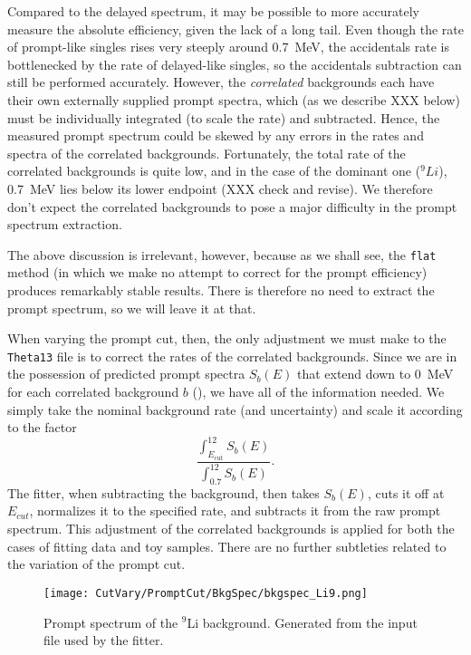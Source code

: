 \documentclass[../thesis.tex]{subfiles}
\begin{document}
Compared to the delayed spectrum, it may be possible to more accurately measure the absolute efficiency, given the lack of a long tail. Even though the rate of prompt-like singles rises very steeply around 0.7~MeV, the accidentals rate is bottlenecked by the rate of delayed-like singles, so the accidentals subtraction can still be performed accurately. However, the \emph{correlated} backgrounds each have their own externally supplied prompt spectra, which (as we describe XXX below) must be individually integrated (to scale the rate) and subtracted. Hence, the measured prompt spectrum could be skewed by any errors in the rates and spectra of the correlated backgrounds. Fortunately, the total rate of the correlated backgrounds is quite low, and in the case of the dominant one ($^9Li$), 0.7~MeV lies below its lower endpoint (XXX check and revise). We therefore don't expect the correlated backgrounds to pose a major difficulty in the prompt spectrum extraction.

The above discussion is irrelevant, however, because as we shall see, the \texttt{flat} method (in which we make no attempt to correct for the prompt efficiency) produces remarkably stable results. There is therefore no need to extract the prompt spectrum, so we will leave it at that.

When varying the prompt cut, then, the only adjustment we must make to the \texttt{Theta13} file is to correct the rates of the correlated backgrounds. Since we are in the possession of predicted prompt spectra $S_b(E)$ that extend down to 0~MeV for each correlated background $b$ (), we have all of the information needed. We simply take the nominal background rate (and uncertainty) and scale it according to the factor
\[
  \frac{\int_{E_{\mathrm{cut}}}^{12} S_b(E)}{\int_{0.7}^{12} S_b(E)}.
\]
The fitter, when subtracting the background, then takes $S_b(E)$, cuts it off at $E_{cut}$, normalizes it to the specified rate, and subtracts it from the raw prompt spectrum. This adjustment of the correlated backgrounds is applied for both the cases of fitting data and toy samples. There are no further subtleties related to the variation of the prompt cut.

\begin{figure}[h]
  \texttt{[image: CutVary/PromptCut/BkgSpec/bkgspec\_Li9.png]}
  \caption{Prompt spectrum of the $^9$Li background. Generated from the input file used by the fitter.}
  \label{fig:bkgspec_Li9}
\end{figure}
\end{document}
